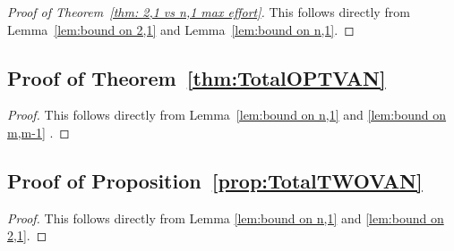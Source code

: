 \begin{proof}[Proof of Theorem~\ref{thm: 2,1 vs n,1 max effort}]
This follows directly from Lemma~\ref{lem:bound on 2,1} and Lemma~\ref{lem:bound on n,1}.
\end{proof}

\subsection*{Proof of Theorem~\ref{thm:TotalOPTVAN}}
\begin{proof}
    This follows directly from Lemma~\ref{lem:bound on n,1} and \ref{lem:bound on m,m-1} .
\end{proof}

\subsection*{Proof of Proposition~\ref{prop:TotalTWOVAN}}
\begin{proof}
    This follows directly from Lemma \ref{lem:bound on n,1} and \ref{lem:bound on 2,1}.
\end{proof}




